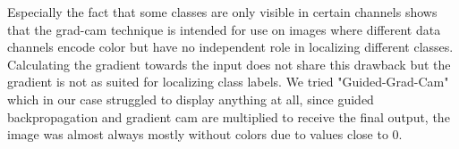 Especially the fact that some classes are only visible in certain channels shows that the grad-cam technique is intended for use on images where different data channels encode color but have no independent role in localizing different classes. Calculating the gradient towards the input does not share this drawback but the gradient is not as suited for localizing class labels. We tried "Guided-Grad-Cam" which in our case struggled to display anything at all, since guided backpropagation and gradient cam are multiplied to receive the final output, the image was almost always mostly without colors due to values close to $0$.

